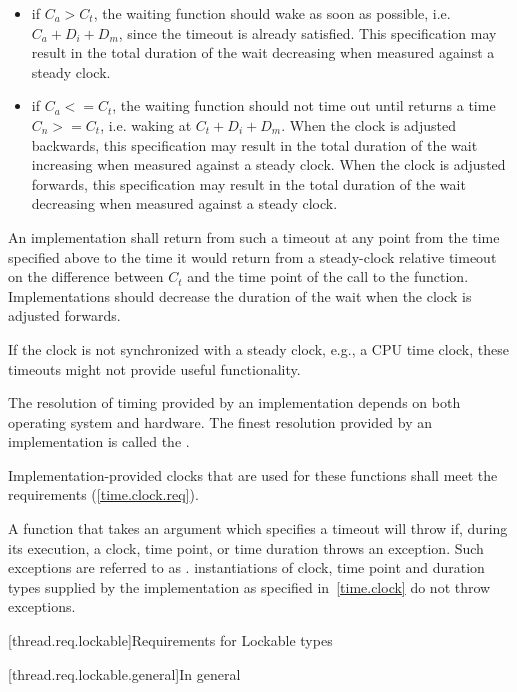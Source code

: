 \begin{itemize}
\item
if $C_a > C_t$, the waiting function should wake as soon as possible, i.e. $C_a + D_i + D_m$,
since the timeout is already satisfied. \enternote This specification may result in the total
duration of the wait decreasing when measured against a steady clock. \exitnote

\item
if $C_a <= C_t$, the waiting function should not time out until  returns a
time $C_n >= C_t$, i.e. waking at $C_t + D_i + D_m$. \enternote When the clock is adjusted
backwards, this specification may result in the total duration of the wait increasing when
measured against a steady clock. When the clock is adjusted forwards, this specification may
result in the total duration of the wait decreasing when measured against a steady clock.
\exitnote
\end{itemize}

An implementation shall return from such a timeout at any point from the time specified above to
the time it would return from a steady-clock relative timeout on the difference between $C_t$
and the time point of the call to the  function. \enternote Implementations
should decrease the duration of the wait when the clock is adjusted forwards.
\exitnote

\pnum
\enternote If the clock is not synchronized with a steady clock, e.g., a CPU time clock, these
timeouts might not provide useful functionality. \exitnote

\pnum
The resolution of timing provided by an implementation depends on both operating system
and hardware. The finest resolution provided by an implementation is called the
.

\pnum
Implementation-provided clocks that are used for these functions shall meet the
 requirements (\ref{time.clock.req}).

\pnum
A function that takes an argument which specifies a timeout will throw if,
during its execution, a clock, time point, or time duration throws an exception.
Such exceptions are referred to as .
\enternote instantiations of clock, time point and duration types supplied by
the implementation as specified in~\ref{time.clock} do not throw exceptions.
\exitnote

[thread.req.lockable]{Requirements for Lockable types}

[thread.req.lockable.general]{In general}

